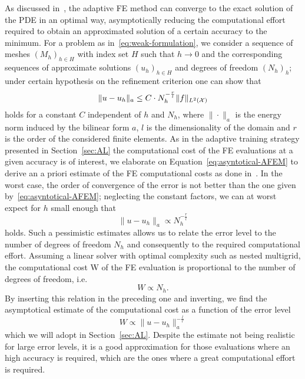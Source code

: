 As discussed in~\cite[Chapter 6.3]{DeuflhardWeiser2012}, the adaptive FE method can converge to the exact solution of the PDE in an optimal way, asymptotically reducing the computational effort required to obtain an approximated solution of a certain accuracy to the minimum. 
For a problem as in~\eqref{eq:weak-formulation}, we consider a sequence of meshes $(M_h)_{h\in H}$ with index set $H$ such that $h \rightarrow 0$ and the corresponding sequences of approximate solutions $(u_h)_{h\in H}$ and degrees of freedom $(N_h)_h$; under certain hypothesis on the refinement criterion one can show that 
\begin{equation}\label{eq:asyntotical-AFEM}
    \| u - u_h \|_a \leq C \cdot N_h^{-\frac{r}{l}} \|f\|_{L^2(\mathcal X)} 
\end{equation}
holds for a constant $C$ independent of $h$ and $N_h$, where $\| \cdot \|_a$ is the energy norm induced by the bilinear form $a$, $l$ is the dimensionality of the domain and $r$ is the order of the considered finite elements. \newline
As in the adaptive training strategy presented in Section~\ref{sec:AL} the computational cost of the FE evaluations at a given accuracy is of interest, we elaborate on Equation~\eqref{eq:asyntotical-AFEM} to derive an a priori estimate of the FE computational costs as done in~\cite{SemlerWeiser2023}.
In the worst case, the order of convergence of the error is not better than the one given by~\eqref{eq:asyntotical-AFEM}; neglecting the constant factors, we can at worst expect for $h$ small enough that
\[
    \| u - u_h \|_a \propto N_h^{-\frac{r}{l}}
\]
holds.
Such a pessimistic estimates allows us to relate the error level to the number of degrees of freedom $N_h$ and consequently to the required computational effort.
Assuming a linear solver with optimal complexity such as nested multigrid, the computational cost W of the FE evaluation is proportional to the number of degrees of freedom, i.e. 
\[
    W \propto N_h.
\]
By inserting this relation in the preceding one and inverting, we find the asymptotical estimate of the computational cost as a function of the error level
\begin{equation}\label{eq:FE-cost}
    W \propto \| u - u_h \|_a^{-\frac{l}{r}}
\end{equation}
which we will adopt in Section~\ref{sec:AL}.
Despite the estimate not being realistic for large error levels, it is a good approximation for those evaluations where an high accuracy is required, which are the ones where a great computational effort is required.